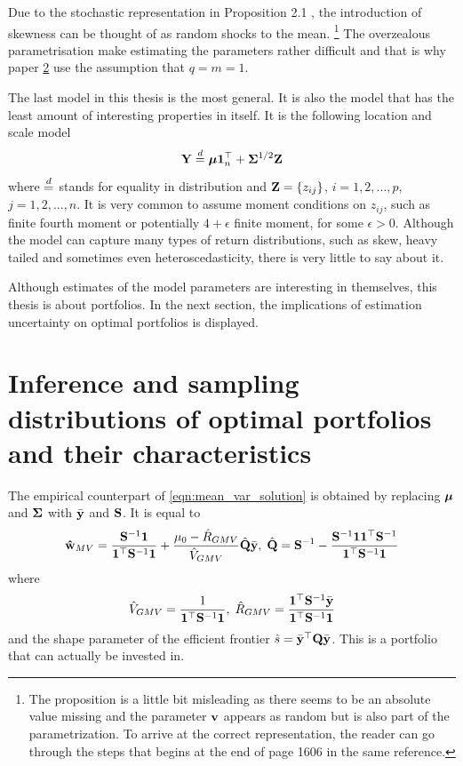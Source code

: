 \documentclass[12pt, oneside]{book}\usepackage{knitr}
\begin{document}
{Due to the stochastic representation in Proposition 2.1 \citet{dominguez2007matrix}, the introduction of skewness can be thought of as random shocks to the mean.
\footnote{The proposition is a little bit misleading as there seems to be an absolute value missing and the parameter $\mathbf{v}$ appears as random but is also part of the parametrization. To arrive at the correct representation, the reader can go through the steps that begins at the end of page 1606 in the same reference.}
The overzealous parametrisation make estimating the parameters rather difficult and that is why paper \hyperref[sec:paper2]{2} use the assumption that $q=m=1$.

The last model in this thesis is the most general.
It is also the model that has the least amount of interesting properties in itself.
It is the following location and scale model
\begin{equation}\label{eqn:location_scale_model}
\mathbf{Y} \stackrel{d}{=} \mbox{\boldmath$\mu$} \mathbf{1}^\top_n + \mathbf{\Sigma}^{1/2} \mathbf{Z}
\end{equation}
where $\stackrel{d}{=}$ stands for equality in distribution and $\mathbf{Z} = \{z_{ij}\}$, $i=1,2,...,p$, $j=1,2,...,n$.
It is very common to assume moment conditions on $z_{ij}$, such as finite fourth moment or potentially $4+\epsilon$ finite moment, for some $\epsilon>0$.
Although the model can capture many types of return distributions, such as skew, heavy tailed and sometimes even heteroscedasticity, there is very little to say about it.

Although estimates of the model parameters are interesting in themselves, this thesis is about portfolios.
In the next section, the implications of estimation uncertainty on optimal portfolios is displayed.

\section{Inference and sampling distributions of optimal portfolios and their characteristics}
The empirical counterpart of \eqref{eqn:mean_var_solution} is obtained by replacing $\mbox{\boldmath$\mu$}$ and $\mathbf{\Sigma}$ with $\bar{\mathbf{y}}$ and $\mathbf{S}$. It is equal to
\begin{equation}\label{eqn:meanvar_solution_sample}
	\mathbf{\hat{w}}_{MV} = \frac{\mathbf{S}^{-1}\mathbf{1}}{\mathbf{1}^\top \mathbf{S}^{-1}\mathbf{1}} + \frac{\mu_0 - \hat{R}_{GMV}}{\hat{V}_{GMV}} \hat{\mathbf{Q}} \bar{\mathbf{y}},\; \hat{\mathbf{Q}} = \mathbf{S}^{-1} - \frac{\mathbf{S}^{-1} \mathbf{1} \mathbf{1}^\top \mathbf{S}^{-1}}{\mathbf{1}^\top \mathbf{S}^{-1} \mathbf{1}}
\end{equation}
where 
\begin{equation}\label{eqn:meanvar_characteristics_sample}
  \hat{V}_{GMV} = \frac{1}{\mathbf{1}^\top \mathbf{S}^{-1}\mathbf{1}},\; \hat{R}_{GMV} = \frac{\mathbf{1}^\top \mathbf{S}^{-1} \bar{\mathbf{y}}}{\mathbf{1}^\top \mathbf{S}^{-1}\mathbf{1}}
\end{equation}
and the shape parameter of the efficient frontier $\hat{s} = \bar{\mathbf{y}}^\top \mathbf{Q} \bar{\mathbf{y}}$.
This is a portfolio that can actually be invested in. 

}
\end{document}
